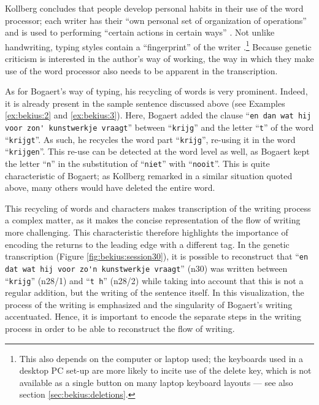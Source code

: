\begin{paper}
\noindent
Kollberg concludes that people develop personal habits in their use of
the word processor; each writer has their ``own personal set of
organization of operations'' and is used to performing ``certain actions
in certain ways'' \citep[78]{kollberg_s-notation_1998}. Not unlike handwriting, typing
styles contain a ``fingerprint'' of the writer \citep[5]{lindgren_researching_2019}.\footnote{This also depends on the computer or laptop
  used; the keyboards used in a desktop PC set-up are more likely to
  incite use of the delete key, which is not available as a single
  button on many laptop keyboard layouts --- see also section \ref{sec:bekius:deletions}.}
Because genetic criticism is interested in the author's way of working,
the way in which they make use of the word processor also needs to be
apparent in the transcription.

As for Bogaert's way of typing, his recycling of words is very
prominent. Indeed, it is already present in the sample sentence
discussed above (see Examples \ref{ex:bekius:2} and \ref{ex:bekius:3}). Here, Bogaert added the clause ``\verb|en dan wat hij| \verb|voor zon' kunstwerkje vraagt|'' between ``\verb|krijg|'' and the
letter ``\verb|t|'' of the word ``\verb|krijgt|''. As such, he recycles the word part
``\verb|krijg|'', re-using it in the word ``\verb|krijgen|''. This re-use can be
detected at the word level as well, as Bogaert kept the letter ``\verb|n|'' in
the substitution of ``\verb|niet|'' with ``\verb|nooit|''. This is quite
characteristic of Bogaert; as Kollberg remarked in a similar situation quoted above, many others  would have deleted the
entire word.

This recycling of words and characters makes transcription of the
writing process a complex matter, as it makes the concise representation
of the flow of writing more challenging. This characteristic therefore
highlights the importance of encoding the returns to the leading edge
with a different tag. In the genetic transcription (Figure \ref{fig:bekius:session30}), it is
possible to reconstruct that ``\verb|en dat wat hij voor zo'n kunstwerkje vraagt|'' (n30) was written between ``\verb|krijg|'' (n28/1) and ``\verb|t h|'' (n28/2)
while taking into account that this is not a regular addition, but the
writing of the sentence itself. In this visualization, the process of
the writing is emphasized and the singularity of Bogaert's writing
accentuated. Hence, it is important to encode the separate steps in the
writing process in order to be able to reconstruct the flow of writing.


\end{paper}
